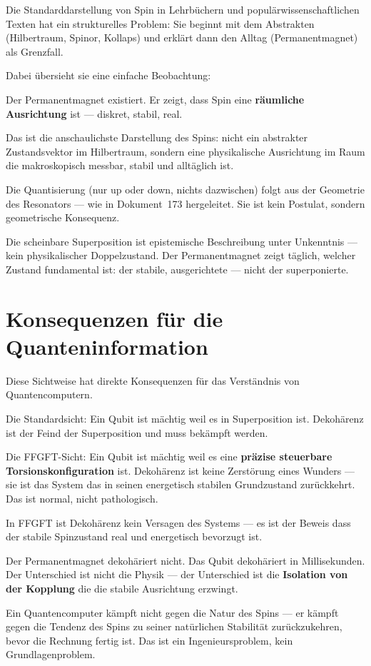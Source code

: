 Die Standarddarstellung von Spin in Lehrbüchern und
populärwissenschaftlichen Texten hat ein strukturelles Problem:
Sie beginnt mit dem Abstrakten (Hilbertraum, Spinor, Kollaps)
und erklärt dann den Alltag (Permanentmagnet) als Grenzfall.

Dabei übersieht sie eine einfache Beobachtung:

\begin{significance}
Der Permanentmagnet existiert.
Er zeigt, dass Spin eine \textbf{räumliche Ausrichtung} ist ---
diskret, stabil, real.

Das ist die anschaulichste Darstellung des Spins:
nicht ein abstrakter Zustandsvektor im Hilbertraum,
sondern eine physikalische Ausrichtung im Raum
die makroskopisch messbar, stabil und alltäglich ist.

Die Quantisierung (nur up oder down, nichts dazwischen)
folgt aus der Geometrie des Resonators --- wie in Dokument~173
hergeleitet. Sie ist kein Postulat, sondern geometrische Konsequenz.

Die scheinbare Superposition ist epistemische Beschreibung
unter Unkenntnis --- kein physikalischer Doppelzustand.
Der Permanentmagnet zeigt täglich, welcher Zustand fundamental ist:
der stabile, ausgerichtete --- nicht der superponierte.
\end{significance}

\section{Konsequenzen für die Quanteninformation}
\label{sec:qi-konsequenzen}

Diese Sichtweise hat direkte Konsequenzen für das Verständnis
von Quantencomputern.

Die Standardsicht: Ein Qubit ist mächtig weil es in Superposition ist.
Dekohärenz ist der Feind der Superposition und muss bekämpft werden.

Die FFGFT-Sicht: Ein Qubit ist mächtig weil es eine
\textbf{präzise steuerbare Torsionskonfiguration} ist.
Dekohärenz ist keine Zerstörung eines Wunders ---
sie ist das System das in seinen energetisch stabilen
Grundzustand zurückkehrt. Das ist normal, nicht pathologisch.

\begin{keypoint}
In FFGFT ist Dekohärenz kein Versagen des Systems ---
es ist der Beweis dass der stabile Spinzustand real und
energetisch bevorzugt ist.

Der Permanentmagnet dekohäriert nicht.
Das Qubit dekohäriert in Millisekunden.
Der Unterschied ist nicht die Physik ---
der Unterschied ist die \textbf{Isolation von der Kopplung}
die die stabile Ausrichtung erzwingt.

Ein Quantencomputer kämpft nicht gegen die Natur des Spins ---
er kämpft gegen die Tendenz des Spins zu seiner natürlichen
Stabilität zurückzukehren, bevor die Rechnung fertig ist.
Das ist ein Ingenieursproblem, kein Grundlagenproblem.
\end{keypoint}

